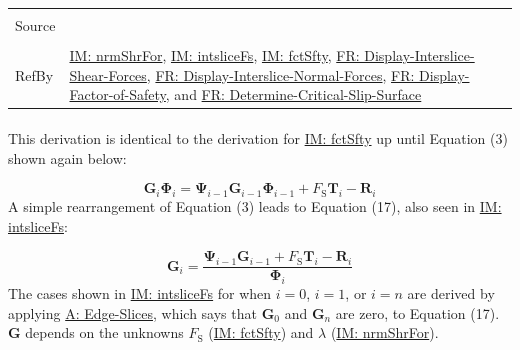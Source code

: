 \documentclass[12pt]{article}
\begin{document}
\begin{minipage}{\textwidth}
\begin{tabular}{>{\raggedright}p{}>{\raggedright\arraybackslash}p{}}
\\ \midrule \\
Source & \cite{chen2005}
         
\\ \midrule \\
RefBy & \hyperref[IM:nrmShrFor]{IM: nrmShrFor}, \hyperref[IM:intsliceFs]{IM: intsliceFs}, \hyperref[IM:fctSfty]{IM: fctSfty}, \hyperref[displayShear]{FR: Display-Interslice-Shear-Forces}, \hyperref[displayNormal]{FR: Display-Interslice-Normal-Forces}, \hyperref[displayFS]{FR: Display-Factor-of-Safety}, and \hyperref[determineCritSlip]{FR: Determine-Critical-Slip-Surface}
        
\\ \bottomrule
\end{tabular}
\end{minipage}
\paragraph{}
\label{IM:intsliceFsDeriv}
This derivation is identical to the derivation for \hyperref[IM:fctSfty]{IM: fctSfty} up until Equation (3) shown again below:

\begin{displaymath}
{\mathbf{G}}_{i} {\mathbf{Φ}}_{i}={\mathbf{Ψ}}_{i-1} {\mathbf{G}}_{i-1} {\mathbf{Φ}}_{i-1}+{F_{\text{S}}} {\mathbf{T}}_{i}-{\mathbf{R}}_{i}
\end{displaymath}
A simple rearrangement of Equation (3) leads to Equation (17), also seen in \hyperref[IM:intsliceFs]{IM: intsliceFs}:

\begin{displaymath}
{\mathbf{G}}_{i}=\frac{{\mathbf{Ψ}}_{i-1} {\mathbf{G}}_{i-1}+{F_{\text{S}}} {\mathbf{T}}_{i}-{\mathbf{R}}_{i}}{{\mathbf{Φ}}_{i}}
\end{displaymath}
The cases shown in \hyperref[IM:intsliceFs]{IM: intsliceFs} for when $i=0$, $i=1$, or $i=n$ are derived by applying \hyperref[assumpES]{A: Edge-Slices}, which says that ${\mathbf{G}}_{0}$ and ${\mathbf{G}}_{n}$ are zero, to Equation (17). $\mathbf{G}$ depends on the unknowns ${F_{\text{S}}}$ (\hyperref[IM:fctSfty]{IM: fctSfty}) and $λ$ (\hyperref[IM:nrmShrFor]{IM: nrmShrFor}).
\end{document}
